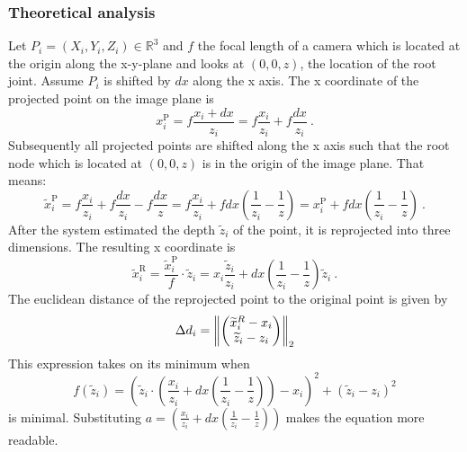 \subsubsection{Theoretical analysis}
Let $P_i=(X_i, Y_i, Z_i) \in \mathbb{R}^3$ and $f$ the focal length of a camera which is located at the origin along the x-y-plane and looks at $(0, 0, z)$, the location of the root joint. 
Assume $P_i$ is shifted by $dx$ along the x axis.
The x coordinate of the projected point on the image plane is
\begin{equation}
	x_i^\mathrm{P} = f \frac{x_i + dx}{z_i} = f \frac{x_i}{z_i} + f \frac{dx}{z_i}\ .
\end{equation}
Subsequently all projected points are shifted along the x axis such that the root node which is located at $(0, 0, z)$ is in the origin of the image plane. That means:
\begin{equation}
	\widetilde{x}_i^\mathrm{P} = f \frac{x_i}{z_i} + f \frac{dx}{z_i} - f \frac{dx}{z} 
	= f \frac{x_i}{z_i} + f dx (\frac{1}{z_i} - \frac{1}{z})
	= x_i^\mathrm{P} + f dx (\frac{1}{z_i} - \frac{1}{z})\ .
\end{equation}
After the system estimated the depth $\widetilde{z}_i$ of the point, it is reprojected into three dimensions. The resulting x coordinate is 
\begin{equation}
	\widetilde{x}_i^\mathrm{R} = \frac{\widetilde{x}_i^\mathrm{P}}{f} \cdot \widetilde{z}_i
	= x_i \frac{\widetilde{z}_i}{z_i} + dx (\frac{1}{z_i} - \frac{1}{z}) \widetilde{z}_i \ .
\end{equation}
The euclidean distance of the reprojected point to the original point is given by
\begin{equation}
\label{eq:delta-d}
	\Delta d_i = \norm{ 
	\begin{pmatrix}
		\widetilde{x}_i^R - x_i \\
		\widetilde{z}_i - z_i
	\end{pmatrix}
	}_2
\end{equation}
This expression takes on its minimum when 
\begin{equation}
	\label{eq:minimum-distance}
	f(\widetilde{z}_i) = \left ( \widetilde{z}_i \cdot \left( \frac{x_i}{z_i} + dx \left( \frac{1}{z_i} - \frac{1}{z} \right) \right ) - x_i \right)^2 + ( \widetilde{z}_i - z_i ) ^2
\end{equation}
is minimal. 
Substituting $a = \left( \frac{x_i}{z_i} + dx \left( \frac{1}{z_i} - \frac{1}{z} \right) \right )$ makes the equation more readable. 

